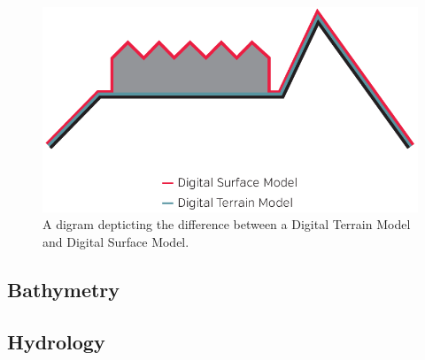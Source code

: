 \documentclass{article}
\begin{document}
\begin{figure}
    \centering
    \includegraphics[width=1.0\linewidth]{images/dsm-dtm.png}
    \caption{A digram depticting the difference between a Digital Terrain Model and Digital Surface Model.}
    \label{figure33}
\end{figure}



\subsection{Bathymetry}



\subsection{Hydrology}

\end{document}
